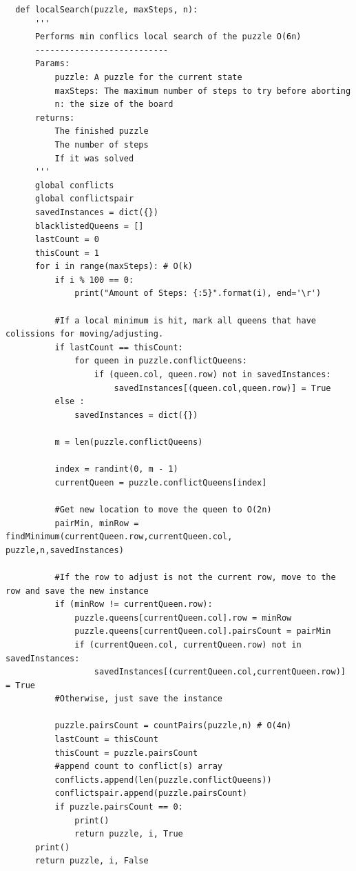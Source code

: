 \documentclass{article}
\begin{document}
\begin{verbatim}
  def localSearch(puzzle, maxSteps, n):
      '''
      Performs min conflics local search of the puzzle O(6n)
      ---------------------------
      Params:
          puzzle: A puzzle for the current state
          maxSteps: The maximum number of steps to try before aborting
          n: the size of the board
      returns:
          The finished puzzle
          The number of steps
          If it was solved
      '''
      global conflicts
      global conflictspair
      savedInstances = dict({})
      blacklistedQueens = []
      lastCount = 0 
      thisCount = 1
      for i in range(maxSteps): # O(k)
          if i % 100 == 0: 
              print("Amount of Steps: {:5}".format(i), end='\r')
  
          #If a local minimum is hit, mark all queens that have colissions for moving/adjusting.
          if lastCount == thisCount:
              for queen in puzzle.conflictQueens: 
                  if (queen.col, queen.row) not in savedInstances: 
                      savedInstances[(queen.col,queen.row)] = True
          else : 
              savedInstances = dict({})
  
          m = len(puzzle.conflictQueens)    
  
          index = randint(0, m - 1)
          currentQueen = puzzle.conflictQueens[index]
  
          #Get new location to move the queen to O(2n)
          pairMin, minRow = findMinimum(currentQueen.row,currentQueen.col, puzzle,n,savedInstances)
               
          #If the row to adjust is not the current row, move to the row and save the new instance
          if (minRow != currentQueen.row): 
              puzzle.queens[currentQueen.col].row = minRow
              puzzle.queens[currentQueen.col].pairsCount = pairMin
              if (currentQueen.col, currentQueen.row) not in savedInstances: 
                  savedInstances[(currentQueen.col,currentQueen.row)] = True
          #Otherwise, just save the instance
      
          puzzle.pairsCount = countPairs(puzzle,n) # O(4n)
          lastCount = thisCount 
          thisCount = puzzle.pairsCount
          #append count to conflict(s) array
          conflicts.append(len(puzzle.conflictQueens))
          conflictspair.append(puzzle.pairsCount)
          if puzzle.pairsCount == 0: 
              print()
              return puzzle, i, True
      print()
      return puzzle, i, False
       

\end{verbatim}
\end{document}
